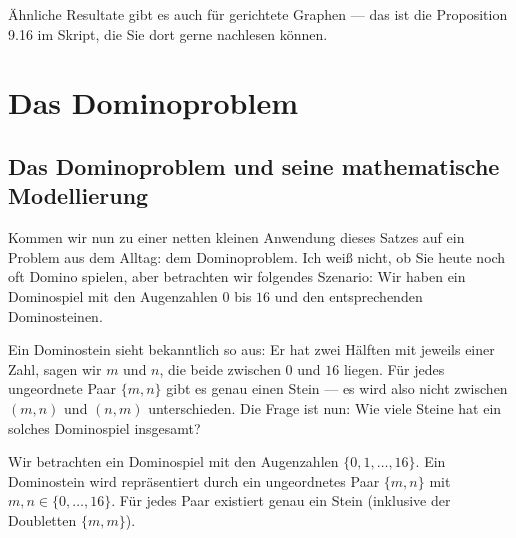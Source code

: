 \begin{spoken-clean}[00:18:56 - 00:20:20]
Ähnliche Resultate gibt es auch für gerichtete Graphen --- das ist die Proposition 9.16 im Skript, die Sie dort gerne nachlesen können.
\end{spoken-clean}

\begin{math-stroke}
\end{math-stroke}

\section{Das Dominoproblem}

\subsection{Das Dominoproblem und seine mathematische Modellierung}

\begin{spoken-clean}[00:20:20 - 00:22:30]
Kommen wir nun zu einer netten kleinen Anwendung dieses Satzes auf ein Problem aus dem Alltag: dem Dominoproblem. Ich weiß nicht, ob Sie heute noch oft Domino spielen, aber betrachten wir folgendes Szenario: Wir haben ein Dominospiel mit den Augenzahlen $0$ bis $16$ und den entsprechenden Dominosteinen.

Ein Dominostein sieht bekanntlich so aus: Er hat zwei Hälften mit jeweils einer Zahl, sagen wir $m$ und $n$, die beide zwischen $0$ und $16$ liegen. Für jedes ungeordnete Paar $\{m, n\}$ gibt es genau einen Stein --- es wird also nicht zwischen $(m, n)$ und $(n, m)$ unterschieden. Die Frage ist nun: Wie viele Steine hat ein solches Dominospiel insgesamt?
\end{spoken-clean}

\begin{math-stroke}
Wir betrachten ein Dominospiel mit den Augenzahlen $\{0, 1, \dots, 16\}$.
Ein Dominostein wird repräsentiert durch ein ungeordnetes Paar $\{m, n\}$ mit $m, n \in \{0, \dots, 16\}$. Für jedes Paar existiert genau ein Stein (inklusive der Doubletten $\{m, m\}$).
\end{math-stroke}

